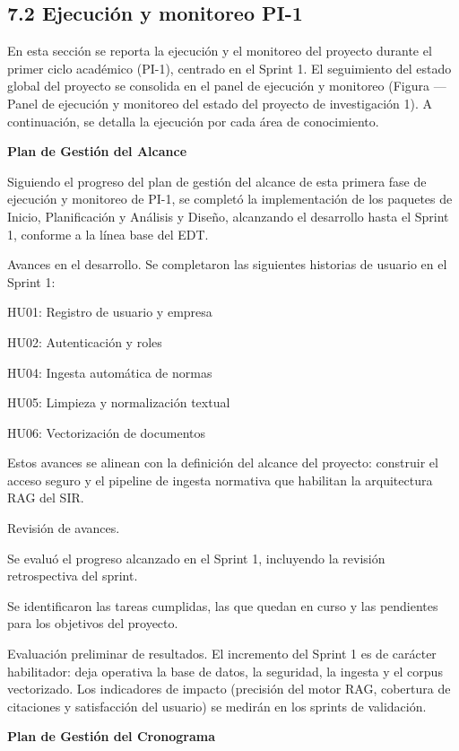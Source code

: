 \documentclass[12pt,a4paper,oneside]{report}
\begin{document}
\subsection{7.2 Ejecución y monitoreo
PI-1}\label{ejecuciuxf3n-y-monitoreo-pi-1}

En esta sección se reporta la ejecución y el monitoreo del proyecto
durante el primer ciclo académico (PI-1), centrado en el Sprint 1. El
seguimiento del estado global del proyecto se consolida en el panel de
ejecución y monitoreo (Figura --- Panel de ejecución y monitoreo del
estado del proyecto de investigación 1). A continuación, se detalla la
ejecución por cada área de conocimiento.

\textbf{Plan de Gestión del Alcance}

Siguiendo el progreso del plan de gestión del alcance de esta primera
fase de ejecución y monitoreo de PI-1, se completó la implementación de
los paquetes de Inicio, Planificación y Análisis y Diseño, alcanzando el
desarrollo hasta el Sprint 1, conforme a la línea base del EDT.

Avances en el desarrollo. Se completaron las siguientes historias de
usuario en el Sprint 1:

HU01: Registro de usuario y empresa

HU02: Autenticación y roles

HU04: Ingesta automática de normas

HU05: Limpieza y normalización textual

HU06: Vectorización de documentos

Estos avances se alinean con la definición del alcance del proyecto:
construir el acceso seguro y el pipeline de ingesta normativa que
habilitan la arquitectura RAG del SIR.

Revisión de avances.

Se evaluó el progreso alcanzado en el Sprint 1, incluyendo la revisión
retrospectiva del sprint.

Se identificaron las tareas cumplidas, las que quedan en curso y las
pendientes para los objetivos del proyecto.

Evaluación preliminar de resultados. El incremento del Sprint 1 es de
carácter habilitador: deja operativa la base de datos, la seguridad, la
ingesta y el corpus vectorizado. Los indicadores de impacto (precisión
del motor RAG, cobertura de citaciones y satisfacción del usuario) se
medirán en los sprints de validación.

\textbf{Plan de Gestión del Cronograma}
\end{document}
